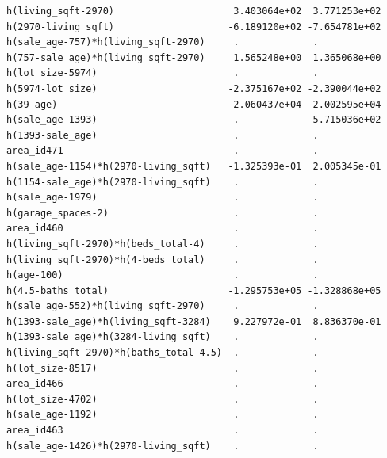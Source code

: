 \documentclass[
]{article}
\begin{document}
\begin{verbatim}
h(living_sqft-2970)                     3.403064e+02  3.771253e+02
h(2970-living_sqft)                    -6.189120e+02 -7.654781e+02
h(sale_age-757)*h(living_sqft-2970)     .             .           
h(757-sale_age)*h(living_sqft-2970)     1.565248e+00  1.365068e+00
h(lot_size-5974)                        .             .           
h(5974-lot_size)                       -2.375167e+02 -2.390044e+02
h(39-age)                               2.060437e+04  2.002595e+04
h(sale_age-1393)                        .            -5.715036e+02
h(1393-sale_age)                        .             .           
area_id471                              .             .           
h(sale_age-1154)*h(2970-living_sqft)   -1.325393e-01  2.005345e-01
h(1154-sale_age)*h(2970-living_sqft)    .             .           
h(sale_age-1979)                        .             .           
h(garage_spaces-2)                      .             .           
area_id460                              .             .           
h(living_sqft-2970)*h(beds_total-4)     .             .           
h(living_sqft-2970)*h(4-beds_total)     .             .           
h(age-100)                              .             .           
h(4.5-baths_total)                     -1.295753e+05 -1.328868e+05
h(sale_age-552)*h(living_sqft-2970)     .             .           
h(1393-sale_age)*h(living_sqft-3284)    9.227972e-01  8.836370e-01
h(1393-sale_age)*h(3284-living_sqft)    .             .           
h(living_sqft-2970)*h(baths_total-4.5)  .             .           
h(lot_size-8517)                        .             .           
area_id466                              .             .           
h(lot_size-4702)                        .             .           
h(sale_age-1192)                        .             .           
area_id463                              .             .           
h(sale_age-1426)*h(2970-living_sqft)    .             .           
                                                                  

\end{verbatim}
\end{document}
